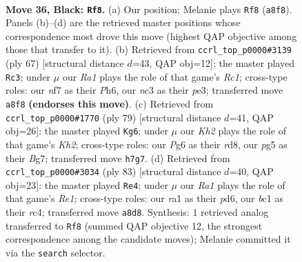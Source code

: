 \documentclass[11pt]{article}
\begin{document}
\clearpage

\begin{figure}[p]\centering
\begin{subfigure}{0.46\textwidth}\centering
\resizebox{\linewidth}{!}{%
\newchessgame
\chessboard[
  setfen={r7/p4N1k/P5p1/1P4P1/1b3P2/2N5/3K4/R1B5 b - - 6 36},
  showmover=false,
  pgfstyle=straightmove, color=movearrow, markmove={a8-f8}
]}
\caption{}
\end{subfigure}\hfill
\begin{subfigure}{0.46\textwidth}\centering
\resizebox{\linewidth}{!}{%
\newchessgame
\chessboard[
  setfen={2r3k1/5p2/7p/1R2P1p1/8/4P1BP/3b1KP1/8 b - - 2 34},
  showmover=false,
  pgfstyle=straightmove, color=movearrow, markmove={c8-c3}
]}
\caption{}
\end{subfigure}
\\[4pt]
\begin{subfigure}{0.46\textwidth}\centering
\resizebox{\linewidth}{!}{%
\newchessgame
\chessboard[
  setfen={3R4/6bk/1n3p2/6pp/1B6/1r1N2PP/5PK1/8 b - - 1 40},
  showmover=false,
  pgfstyle=straightmove, color=movearrow, markmove={h7-g6}
]}
\caption{}
\end{subfigure}\hfill
\begin{subfigure}{0.46\textwidth}\centering
\resizebox{\linewidth}{!}{%
\newchessgame
\chessboard[
  setfen={4r3/5ppk/1b1P3p/5P2/2RN4/P6P/5KP1/8 b - - 2 42},
  showmover=false,
  pgfstyle=straightmove, color=movearrow, markmove={e8-e4}
]}
\caption{}
\end{subfigure}
\caption{\textbf{Move 36, Black: \texttt{Rf8}.} (a) Our position; Melanie plays \texttt{Rf8} (\texttt{a8f8}). Panels (b)--(d) are the retrieved master positions whose correspondence most drove this move (highest QAP objective among those that transfer to it). (b) Retrieved from \texttt{ccrl\_top\_p0000\#3139} (ply 67) [structural distance $d$=43, QAP obj=12]: the master played \texttt{Rc3}; under $\mu$ our \emph{Ra1} plays the role of that game's \emph{Rc1}; cross-type roles: our \emph{n}f7 as their \emph{P}h6, our \emph{n}c3 as their \emph{p}e3; transferred move \texttt{a8f8} \textbf{(endorses this move)}. (c) Retrieved from \texttt{ccrl\_top\_p0000\#1770} (ply 79) [structural distance $d$=41, QAP obj=26]: the master played \texttt{Kg6}; under $\mu$ our \emph{Kh2} plays the role of that game's \emph{Kh2}; cross-type roles: our \emph{P}g6 as their \emph{r}d8, our \emph{p}g5 as their \emph{B}g7; transferred move \texttt{h7g7}. (d) Retrieved from \texttt{ccrl\_top\_p0000\#3034} (ply 83) [structural distance $d$=40, QAP obj=23]: the master played \texttt{Re4}; under $\mu$ our \emph{Ra1} plays the role of that game's \emph{Re1}; cross-type roles: our \emph{r}a1 as their \emph{p}d6, our \emph{b}c1 as their \emph{r}c4; transferred move \texttt{a8d8}. Synthesis: 1 retrieved analog transferred to \texttt{Rf8} (summed QAP objective 12, the strongest correspondence among the candidate moves); Melanie committed it via the \texttt{search} selector.}
\label{fig:thought-m71}
\end{figure}
\end{document}
